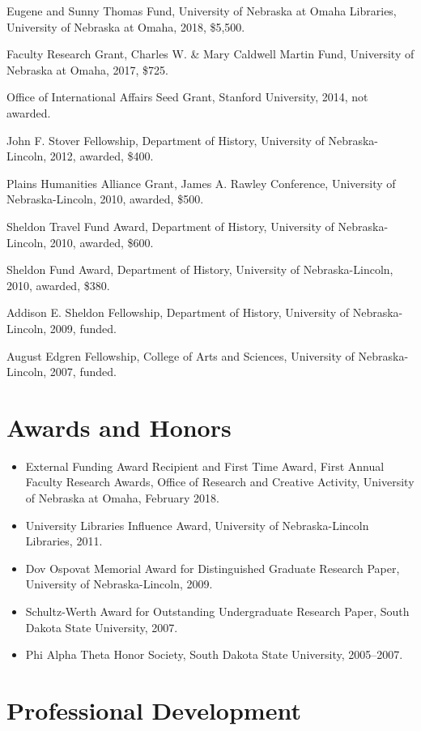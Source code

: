 Eugene and Sunny Thomas Fund, University of Nebraska at Omaha Libraries,
University of Nebraska at Omaha, 2018, \$5,500.

Faculty Research Grant, Charles W. \& Mary Caldwell Martin Fund,
University of Nebraska at Omaha, 2017, \$725.

Office of International Affairs Seed Grant, Stanford University, 2014,
not awarded.

John F. Stover Fellowship, Department of History, University of
Nebraska-Lincoln, 2012, awarded, \$400.

Plains Humanities Alliance Grant, James A. Rawley Conference, University
of Nebraska-Lincoln, 2010, awarded, \$500.

Sheldon Travel Fund Award, Department of History, University of
Nebraska-Lincoln, 2010, awarded, \$600.

Sheldon Fund Award, Department of History, University of
Nebraska-Lincoln, 2010, awarded, \$380.

Addison E. Sheldon Fellowship, Department of History, University of
Nebraska-Lincoln, 2009, funded.

August Edgren Fellowship, College of Arts and Sciences, University of
Nebraska-Lincoln, 2007, funded.

\section{Awards and Honors}\label{awards-and-honors}

\begin{itemize}
\tightlist
\item
  External Funding Award Recipient and First Time Award, First Annual
  Faculty Research Awards, Office of Research and Creative Activity,
  University of Nebraska at Omaha, February 2018.
\item
  University Libraries Influence Award, University of Nebraska-Lincoln
  Libraries, 2011.
\item
  Dov Ospovat Memorial Award for Distinguished Graduate Research Paper,
  University of Nebraska-Lincoln, 2009.
\item
  Schultz-Werth Award for Outstanding Undergraduate Research Paper,
  South Dakota State University, 2007.
\item
  Phi Alpha Theta Honor Society, South Dakota State University,
  2005--2007.
\end{itemize}

\section{Professional Development}\label{professional-development}

